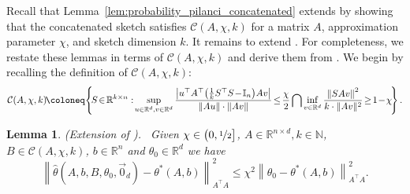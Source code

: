 \documentclass[11pt]{article}
\newtheorem{lem}{Lemma}
\theoremstyle{definition}
\theoremstyle{plain}
\providecommand{\lemmaref}[1]{Lemma~\ref{#1}}
\newcommand{\reals}{\mathbb{R}}
\newcommand{\nats}{\mathbb{N}}
\providecommand{\brI}{\mathbb{I}}
\newcommand{\Norm}[1]{\left\| #1 \right\|}
\providecommand{\norm}[1]{\Norm{#1}}
\begin{document}
Recall that \lemmaref{lem:probability_pilanci_concatenated} extends \citet[Lemma.~8]{lev2026near} by showing that the concatenated sketch satisfies $\mathcal{C}(A,\chi,k)$ for a matrix $A$, approximation parameter $\chi$, and sketch dimension $k$. It remains to extend \citet[Lemmas~10--12]{lev2026near}. For completeness, we restate these lemmas in terms of $\mathcal{C}(A,\chi,k)$ and derive them from \citet{lev2026near}. We begin by recalling the definition of $\mathcal{C}(A,\chi,k)$:
\begin{equation}
    \mathcal{C}(A, \chi, k) \hspace{-0.15em}\coloneq\hspace{-0.15em} \left\{\hspace{-0.15em}S\hspace{-0.15em}\in\hspace{-0.15em} \reals^{k\times n}: \hspace{-0.15em}\sup_{u \in \reals^{d}, v \in \reals^{d}} \frac{\left|u^{\top}A^{\top}\hspace{-0.15em}\left(\frac{1}{k}S^{\top}S \hspace{-0.15em}-\hspace{-0.15em} \brI_{n}\right)\hspace{-0.15em} A v\right|}{\|A u\| \cdot \|A v\|} \hspace{-0.15em}\leq\hspace{-0.15em} \frac{\chi}{2} \bigcap \inf_{v \in \reals^{d}} \frac{\norm{SA v}^2}{k \cdot \|Av\|^{2}} \hspace{-0.15em}\geq\hspace{-0.15em} 1\hspace{-0.15em}-\hspace{-0.15em}\chi\hspace{-0.15em}\right\}.
\end{equation}
\begin{lem}{(Extension of \citet[Lemma.~10]{lev2026near}).} \ 
    \label{lem:extend_lem_10}
    Given $\chi \in \big(0, \nicefrac{1}{2}\big]$, $A \in \reals^{n\times d}, k\in \nats$, $B \in \mathcal{C}(A, \chi, k)$, $b \in \reals^{n}$ and $\theta_{0} \in \reals^{d}$ we have
    \begin{equation}
        \norm{\widehat{\theta}(A, b, B, \theta_0, \vec{0}_d) - \theta^{*}(A,b)}^2_{A^{\top}A} \leq \chi^2 \norm{\theta_0 - \theta^{*}(A,b)}^2_{A^{\top}A}.
    \end{equation}
\end{lem}
\end{document}
